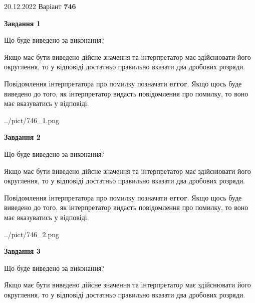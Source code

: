 \documentclass[12pt, ukrainian]{article}
\begin{document}
{20.12.2022 Варіант \No \textbf { 746 }\par}
{
\begin {Large}

{\begin {center}\textbf{Завдання 1}\end {center}}\par
Що буде виведено за виконання? \par

Якщо має бути виведено дійсне значення та інтерпретатор має здійснювати його округлення, 
то у відповіді достатньо правильно вказати два дробових розряди.

Повідомлення інтерпретатора про помилку позначати \textbf{error}.
Якщо щось буде виведено до того, як інтерпретатор видасть повідомлення про помилку, 
то воно має вказуватись у відповіді. \par

\begin{center}
	{../pict/746_1.png}
\end{center}
\newpage

{\begin {center}\textbf{Завдання 2}\end {center}}\par
Що буде виведено за виконання? \par

Якщо має бути виведено дійсне значення та інтерпретатор має здійснювати його округлення, 
то у відповіді достатньо правильно вказати два дробових розряди.

Повідомлення інтерпретатора про помилку позначати \textbf{error}.
Якщо щось буде виведено до того, як інтерпретатор видасть повідомлення про помилку, 
то воно має вказуватись у відповіді. \par

\begin{center}
	{../pict/746_2.png}
\end{center}
\newpage

{\begin {center}\textbf{Завдання 3}\end {center}}\par
Що буде виведено за виконання? \par

Якщо має бути виведено дійсне значення та інтерпретатор має здійснювати його округлення, 
то у відповіді достатньо правильно вказати два дробових розряди.


\end{Large}}
\end{document}

